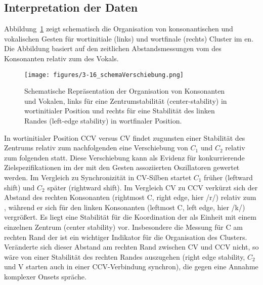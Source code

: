 {\subsection{Interpretation der Daten}
\label{subsec:030403}

Abbildung~\ref{figure:0316} zeigt schematisch die Organisation von konsonantischen und vokalischen Gesten für wortinitiale (links) und wortfinale (rechts) Cluster im en. Die Abbildung basiert auf den zeitlichen Abstandsmessungen vom  des Konsonanten relativ zum  des Vokals. 

\begin{figure}
	\texttt{[image: figures/3-16\_schemaVerschiebung.png]}
	\caption{Schematische Repräsentation der Organisation von Konsonanten und Vokalen, links für eine Zentrumstabilität (center-stability) in wortinitialer Position und rechts für eine Stabilität des linken Randes (left-edge stability) in wortfinaler Position.}
	\label{figure:0316}
\end{figure}

In wortinitialer Position CCV versus CV findet zugunsten einer Stabilität des Zentrums relativ zum nachfolgenden  eine Verschiebung von  ${C}_{1}$ und  ${C}_{2}$ relativ zum folgenden  statt. Diese Verschiebung kann als Evidenz für konkurrierende Zielspezifikationen im  der mit den Gesten assoziierten Oszillatoren gewertet werden. Im Vergleich zu Synchronizität in CV-Silben startet  ${C}_{1}$ früher (leftward shift) und  ${C}_{2}$ später (rightward shift). Im Vergleich CV zu CCV verkürzt sich der Abstand des rechten Konsonanten (rightmost C, right edge, hier /r/) relativ zum , während er sich für den linken Konsonanten (leftmost C, left edge, hier /k/) vergrößert. Es liegt eine Stabilität für die Koordination der  als Einheit mit einem einzelnen Zentrum (center stability) vor. Insbesondere die Messung für C am rechten Rand der  ist ein wichtiger Indikator für die Organisation des Clusters. Veränderte sich dieser Abstand am rechten Rand zwischen CV und CCV nicht, so wäre von einer Stabilität des rechten Randes auszugehen (right edge stability, ${C}_{2}$ und V starten auch in einer CCV-Verbindung synchron), die gegen eine Annahme komplexer Onsets spräche.

}

